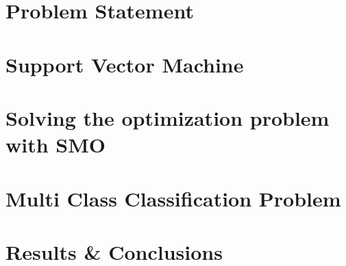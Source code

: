\documentclass[12pt, a4paper, openany]{report} %
\theoremstyle{definition}
\numberwithin{equation}{chapter}
\begin{document}
\cleardoublepage
  \pagestyle{plain}

\chapter*{Problem Statement}




\chapter*{Support Vector Machine}




\chapter*{Solving the optimization problem with SMO}



\chapter*{Multi Class Classification Problem}



\chapter*{Results \& Conclusions}



  

%  
\end{document}
